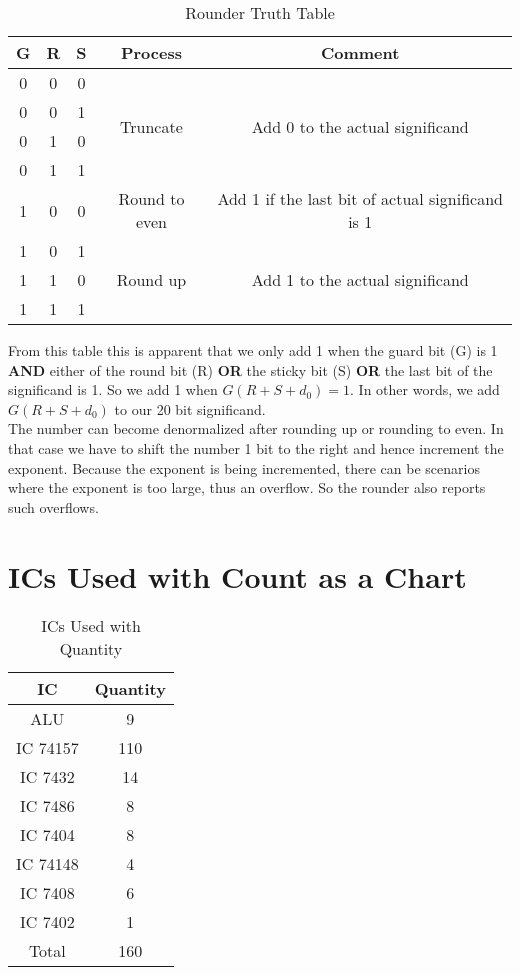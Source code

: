 \documentclass[14pt]{article}
\begin{document}
\begin{table}[!h]
	\begin{center}
		\begin{tabular}{|c|c|c|c|c|}
			\hline
			\textbf{G} & \textbf{R} & \textbf{S} & \textbf{Process} & \textbf{Comment}\\
			\hline
			0 & 0 & 0 & \multirow{4}{*}{Truncate} & \multirow{4}{*}{Add 0 to the actual significand}\\
			\cline{1-3}
			0 & 0 & 1 & &\\
			\cline{1-3}
			0 & 1 & 0 & &\\
			\cline{1-3}
			0 & 1 & 1 & &\\
			\hline
			1 & 0 & 0 & Round to even & Add 1 if the last bit of actual significand is 1\\
			\hline
			1 & 0 & 1 & \multirow{3}{*}{Round up} & \multirow{3}{*}{Add 1 to the actual significand}\\
			\cline{1-3}
			1 & 1 & 0 & & \\
			\cline{1-3}
			1 & 1 & 1 & & \\
			\hline
		\end{tabular}
		\caption{Rounder Truth Table}
	\end{center}
\end{table}
From this table this is apparent that we only add 1 when the guard bit (G) is 1 \textbf{AND} either of the round bit (R) \textbf{OR} the sticky bit (S) \textbf{OR} the last bit of the significand is 1. So we add 1 when $G(R + S + d_0) = 1$. In other words, we add $G(R + S + d_0)$ to our 20 bit significand.\\

The number can become denormalized after rounding up or rounding to even. In that case we have to shift the number 1 bit to the right and hence increment the exponent. Because the exponent is being incremented, there can be scenarios where the exponent is too large, thus an overflow. So the rounder also reports such overflows.

\section{ICs Used with Count as a Chart}
\begin{table}[!h]
	\begin{center}
		\begin{tabular}{c c}
			\textbf{IC} & \textbf{Quantity}\\
			\hline
			\hline
			ALU & 9\\
			IC 74157 & 110\\
			IC 7432 & 14\\
			IC 7486 & 8\\
			IC 7404 & 8\\
			IC 74148 & 4\\
			IC 7408 & 6\\
			IC 7402 & 1\\
			\hline
			Total & 160
		\end{tabular}
		\caption{ICs Used with Quantity}
	\end{center}
\end{table}
\end{document}
